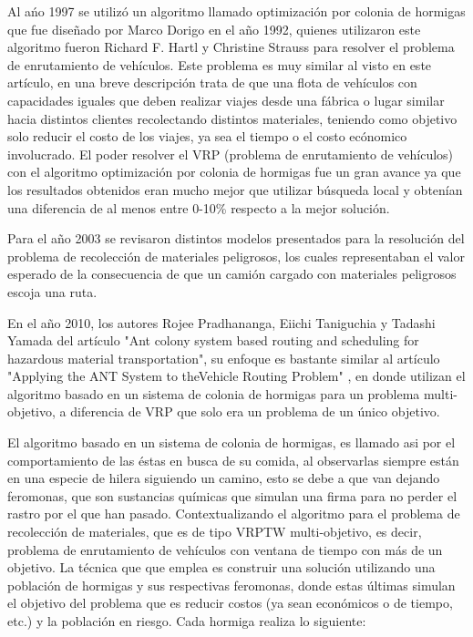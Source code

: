 \documentclass[conference]{IEEEtran}
\begin{document}
Al a\'no 1997 \cite{b5} se utiliz\'o un algoritmo llamado optimizaci\'on por colonia de hormigas que fue dise\~nado por Marco Dorigo en el a\~no 1992, quienes utilizaron este algoritmo fueron Richard F. Hartl y Christine Strauss para resolver el problema de enrutamiento de veh\'iculos. Este problema es muy similar al visto en este art\'iculo, en una breve descripci\'on trata de que una flota de veh\'iculos con capacidades iguales que deben realizar viajes desde una f\'abrica o lugar similar hacia distintos clientes recolectando distintos materiales, teniendo como objetivo solo reducir el costo de los viajes, ya sea el tiempo o el costo ec\'onomico involucrado. El poder resolver el VRP (problema de enrutamiento de veh\'iculos) con el algoritmo optimizaci\'on por colonia de hormigas fue un gran avance ya que los resultados obtenidos eran mucho mejor que utilizar b\'usqueda local y obten\'ian una diferencia de al menos entre 0-10\% respecto a la mejor soluci\'on. 

Para el a\~no 2003 \cite{b6} se revisaron distintos modelos presentados para la resoluci\'on del problema de recolecci\'on de materiales peligrosos, los cuales representaban el valor esperado de la consecuencia de que un cami\'on cargado con materiales peligrosos escoja una ruta.

En el a\~no 2010, los autores Rojee  Pradhananga,  Eiichi  Taniguchia y Tadashi  Yamada del art\'iculo \cite{b1} "Ant colony system based routing and scheduling for hazardous material transportation", su enfoque es bastante similar al art\'iculo "Applying  the  ANT  System  to  theVehicle Routing Problem" \cite{b5}, en donde utilizan el algoritmo basado en un sistema de colonia de hormigas para un problema multi-objetivo, a diferencia de VRP que solo era un problema de un \'unico objetivo. 

El algoritmo basado en un sistema de colonia de hormigas, es llamado asi por el comportamiento de las éstas en busca de su comida, al observarlas siempre están en una especie de hilera siguiendo un camino, esto se debe a que van dejando feromonas, que son sustancias qu\'imicas que simulan una firma para no perder el rastro por el que han pasado. Contextualizando el algoritmo para el problema de recolecci\'on de materiales, que es de tipo VRPTW multi-objetivo, es decir, problema de enrutamiento de veh\'iculos con ventana de tiempo con m\'as de un objetivo. La t\'ecnica que que emplea es construir una soluci\'on utilizando una poblaci\'on de hormigas y sus respectivas feromonas, donde estas \'ultimas simulan el objetivo del problema que es reducir costos (ya sean econ\'omicos o de tiempo, etc.) y la poblaci\'on en riesgo. Cada hormiga realiza lo siguiente:
\end{document}
